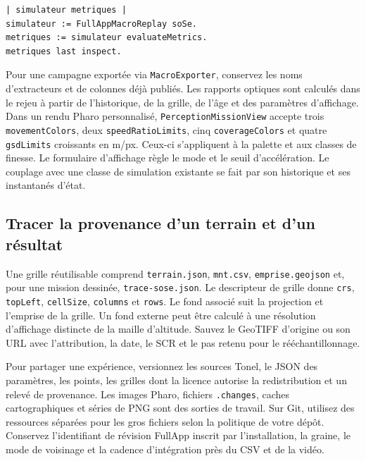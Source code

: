 \documentclass[11pt,a4paper]{article}
\newcommand{\sel}[1]{\texttt{#1}}
\begin{document}
\begin{lstlisting}
| simulateur metriques |
simulateur := FullAppMacroReplay soSe.
metriques := simulateur evaluateMetrics.
metriques last inspect.
\end{lstlisting}

Pour une campagne exportée via \sel{MacroExporter}, conservez les noms d'extracteurs et de colonnes déjà publiés. Les rapports optiques sont calculés dans le rejeu à partir de l'historique, de la grille, de l'âge et des paramètres d'affichage. Dans un rendu Pharo personnalisé, \sel{PerceptionMissionView} accepte trois \sel{movementColors}, deux \sel{speedRatioLimits}, cinq \sel{coverageColors} et quatre \sel{gsdLimits} croissants en m/px. Ceux-ci s'appliquent à la palette et aux classes de finesse. Le formulaire d'affichage règle le mode et le seuil d'accélération. Le couplage avec une classe de simulation existante se fait par son historique et ses instantanés d'état.

\subsection{Tracer la provenance d'un terrain et d'un résultat}
Une grille réutilisable comprend \sel{terrain.json}, \sel{mnt.csv}, \sel{emprise.geojson} et, pour une mission dessinée, \sel{trace-sose.json}. Le descripteur de grille donne \sel{crs}, \sel{topLeft}, \sel{cellSize}, \sel{columns} et \sel{rows}. Le fond associé suit la projection et l'emprise de la grille. Un fond externe peut être calculé à une résolution d'affichage distincte de la maille d'altitude. Sauvez le GeoTIFF d'origine ou son URL avec l'attribution, la date, le SCR et le pas retenu pour le rééchantillonnage.

Pour partager une expérience, versionnez les sources Tonel, le JSON des paramètres, les points, les grilles dont la licence autorise la redistribution et un relevé de provenance. Les images Pharo, fichiers \sel{.changes}, caches cartographiques et séries de PNG sont des sorties de travail. Sur Git, utilisez des ressources séparées pour les gros fichiers selon la politique de votre dépôt. Conservez l'identifiant de révision FullApp inscrit par l'installation, la graine, le mode de voisinage et la cadence d'intégration près du CSV et de la vidéo.


\end{document}
